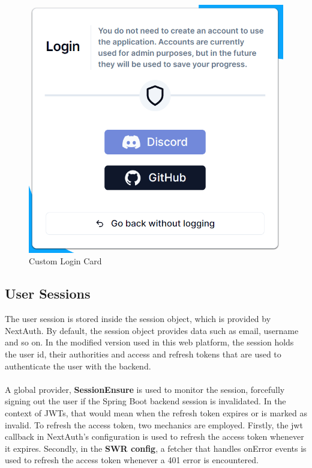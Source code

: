 \begin{figure}[hbt!]
    \centering
    \includegraphics[scale=0.9]{images/login-card.png}
    \caption{Custom Login Card}
    \label{fig:login-card}
\end{figure}


\subsection{User Sessions}

\noindent The user session is stored inside the session object, which is provided by NextAuth. By default, the session object provides data such as email, username and so on. In the modified version used in this web platform, the session holds the user id, their authorities and access and refresh tokens that are used to authenticate the user with the backend.
\\\\
\noindent A global provider, \textbf{SessionEnsure} is used to monitor the session, forcefully signing out the user if the Spring Boot backend session is invalidated. In the context of JWTs, that would mean when the refresh token expires or is marked as invalid. To refresh the access token, two mechanics are employed. Firstly, the jwt callback in NextAuth's configuration is used to refresh the access token whenever it expires. Secondly, in the \textbf{SWR config}, a fetcher that handles onError events is used to refresh the access token whenever a 401 error is encountered.
